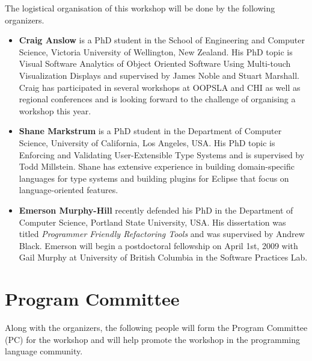 \documentclass{acm_proc_article-sp}
\begin{document}
The logistical organisation of this workshop will be done by the following organizers.

\begin{itemize}
\item \textbf{Craig Anslow} is a PhD student in the School of
Engineering and Computer Science, Victoria University of Wellington,
New Zealand. His PhD topic is Visual Software Analytics of Object
Oriented Software Using Multi-touch Visualization Displays and
supervised by James Noble and Stuart Marshall. Craig has participated
in several workshops at OOPSLA and CHI as well as regional conferences
and is looking forward to the challenge of organising a workshop this
year.

\item \textbf{Shane Markstrum} is a PhD student in the Department of
Computer Science, University of California, Los Angeles, USA. His PhD
topic is Enforcing and Validating User-Extensible Type Systems and is
supervised by Todd Millstein. Shane has extensive experience in
building domain-specific languages for type systems and building
plugins for Eclipse that focus on language-oriented features.

\item \textbf{Emerson Murphy-Hill} recently defended his PhD in the
Department of Computer Science, Portland State University, USA. His
dissertation was titled \emph{Programmer Friendly Refactoring Tools} and was supervised by
Andrew Black. Emerson will begin a postdoctoral fellowship on April 1st, 2009 with Gail Murphy at
University of British Columbia in the Software Practices Lab.
\end{itemize}

\section{Program Committee}

Along with the organizers, the following people will form the Program Committee (PC) for
the workshop and will help promote the workshop in the programming
language community.
\end{document}
